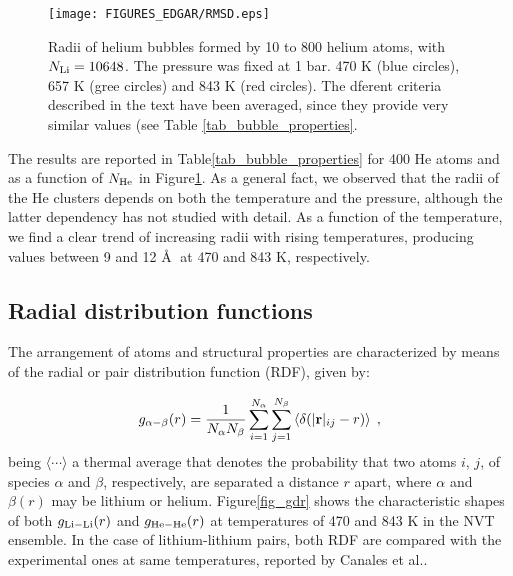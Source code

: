 \documentclass[jcp,amsmath,amssymb,preprint]{revtex4-1}
\begin{document}
\begin{figure}[htbp]
\begin{center}
\texttt{[image: FIGURES\_EDGAR/RMSD.eps]}
\caption{\label{fig_RvsNHe} Radii of helium bubbles formed by 10 to 800 helium atoms, with $N_{\rm Li} = 10648$. The pressure was fixed at 1 bar. 470 K (blue circles), 657 K (gree circles) and 843 K (red circles). The dferent criteria described in the text have been averaged, since they provide very similar values (see Table \ref{tab_bubble_properties}.}
\end{center}
\end{figure} 

The results are reported in Table\ref{tab_bubble_properties} for 400 He atoms and as a function of $N_{\rm He}$ in
Figure\ref{fig_RvsNHe}. As a general fact,  we observed that the radii of the He clusters depends on both the temperature and the pressure, although the latter dependency has not studied with detail.  As a function of the temperature,  we find a clear trend of increasing radii with rising temperatures,  producing values between 9 and 12 \AA$\;$ at 470 and 843 K, respectively.

\subsection{\label{gdr} Radial distribution functions}

The arrangement of atoms and structural properties are characterized by means of the radial or pair distribution function (RDF), given by:

\begin{equation}
              g_{\alpha - \beta}(r) = \frac{1}{N_\alpha N_\beta}
              \sum_{i=1}^{N_\alpha} \sum_{j=1}^{N_\beta}
              \left\langle \delta( |{\bf r}|_{ij} - r)
              \right\rangle\;,
            \label{eq_gdr}
\end{equation}
being $\langle \cdots\rangle$ a thermal average that denotes the probability that two atoms $i$, $j$, of species $\alpha$ and $\beta$, respectively, are separated a distance $r$ apart, where $\alpha$ and $\beta(r)$ may be lithium or helium. Figure\ref{fig_gdr} shows the characteristic shapes of both $g_{\rm Li-Li}(r)$ and $g_{\rm He-He}(r)$ at temperatures of 470 and 843 K in the NVT ensemble.  In the case of lithium-lithium pairs, both RDF are compared with the experimental ones at same temperatures, reported by Canales et al.\cite{canales1994computer}.  
\end{document}
